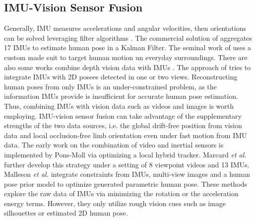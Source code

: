 \documentclass[lettersize,journal]{IEEEtran}
\begin{document}
\subsection{IMU-Vision Sensor Fusion}

Generally, IMU measures accelerations and angular velocities, then orientations can be solved leveraging filter algorithms \cite{bachmann2001inertial,foxlin1996inertial,del2018computationally,roetenberg2005compensation,vitali2020robust}. The commercial solution of \cite{xsens2009full} aggregates 17 IMUs to estimate human pose in a Kalman Filter. The seminal work of \cite{vlasic2007practical} uses a custom made suit to target human motion un everyday surroundings. There are also some works combine depth vision data with IMUs \cite{helten2013personalization,zheng2018hybridfusion}. The approach of \cite{malleson2017real} tries to integrate IMUs with 2D posees detected in one or two views. Reconstructing human poses from only IMUs is an under-constrained problem, as the information IMUs provide is insufficient for accurate human pose estimation. Thus, combining IMUs with vision data such as videos and images is worth employing. IMU-vision sensor fusion can take advantage of the supplementary strengths of the two data sources, i.e. the global drift-free position from vision data and local occlusion-free limb orientation even under fast motion from IMU data. The early work on the combination of video and inertial sensors is implemented by Pons-Moll \cite{pons2010multisensor} via optimizing a local hybrid tracker. Marcard \emph{et al.} \cite{von2016human} further develop this strategy under a setting of 8 viewpoint videos and 13 IMUs. Malleson \emph{et al.} \cite{malleson2019real} integrate constraints from IMUs, multi-view images and a human pose prior model to optimize generated parametric human pose. These methods explore the raw data of IMUs via minimizing the rotation or the acceleration energy terms. However, they only utilize rough vision cues such as image silhouettes or estimated 2D human pose.
\end{document}

